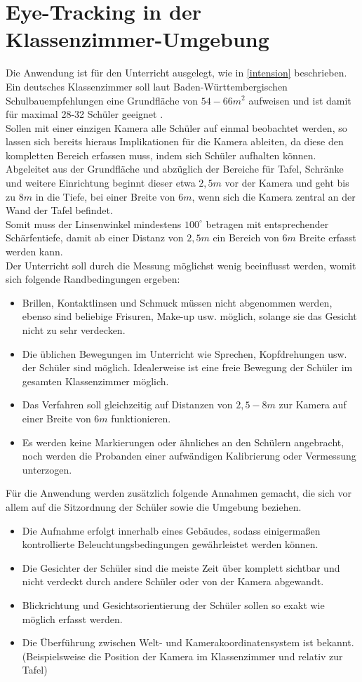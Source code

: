 \section{Eye-Tracking in der Klassenzimmer-Umgebung}
Die Anwendung ist für den Unterricht ausgelegt, wie in \autoref{intension} beschrieben. Ein deutsches Klassenzimmer soll laut Baden-Württembergischen Schulbauempfehlungen eine Grundfläche von $54-66m^2$ aufweisen und ist damit für maximal 28-32 Schüler geeignet \cite{bauordung}.\\
Sollen mit einer einzigen Kamera alle Schüler auf einmal beobachtet werden, so lassen sich bereits hieraus Implikationen für die Kamera ableiten, da diese den kompletten Bereich erfassen muss, indem sich Schüler aufhalten können.\\
Abgeleitet aus der Grundfläche und abzüglich der Bereiche für Tafel, Schränke und weitere Einrichtung beginnt dieser etwa $2,5m$ vor der Kamera und geht bis zu $8m$ in die Tiefe, bei einer Breite von $6m$, wenn sich die Kamera zentral an der Wand der Tafel befindet.\\
Somit muss der Linsenwinkel mindestens $100^\circ$ betragen mit entsprechender Schärfentiefe, damit ab einer Distanz von $2,5m$ ein Bereich von $6m$ Breite erfasst werden kann.\\
Der Unterricht soll durch die Messung möglichst wenig beeinflusst werden, womit sich folgende Randbedingungen ergeben:
\begin{itemize}
\item Brillen, Kontaktlinsen und Schmuck müssen nicht abgenommen werden, ebenso sind beliebige Frisuren, Make-up usw. möglich, solange sie das Gesicht nicht zu sehr verdecken.
\item Die üblichen Bewegungen im Unterricht wie Sprechen, Kopfdrehungen usw. der Schüler sind möglich. Idealerweise ist eine freie Bewegung der Schüler im gesamten Klassenzimmer möglich.
\item Das Verfahren soll gleichzeitig auf Distanzen von $2,5 - 8m$ zur Kamera auf einer Breite von $6m$ funktionieren.
\item Es werden keine Markierungen oder ähnliches an den Schülern angebracht, noch werden die Probanden einer aufwändigen Kalibrierung oder Vermessung unterzogen.
\end{itemize}
Für die Anwendung werden zusätzlich folgende Annahmen gemacht, die sich vor allem auf die Sitzordnung der Schüler sowie die Umgebung beziehen.
\begin{itemize}
\item Die Aufnahme erfolgt innerhalb eines Gebäudes, sodass einigermaßen kontrollierte Beleuchtungsbedingungen gewährleistet werden können.
\item Die Gesichter der Schüler sind die meiste Zeit über komplett sichtbar und nicht verdeckt durch andere Schüler oder von der Kamera abgewandt.
\item Blickrichtung und Gesichtsorientierung der Schüler sollen so exakt wie möglich erfasst werden.
\item Die Überführung zwischen Welt- und Kamerakoordinatensystem ist bekannt.\\
(Beispielsweise die Position der Kamera im Klassenzimmer und relativ zur Tafel)
\end{itemize}
